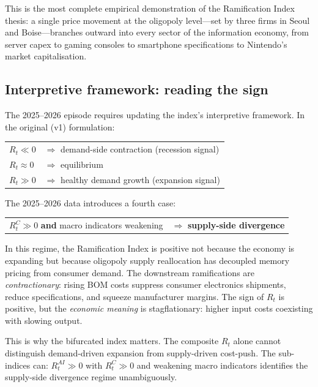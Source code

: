 \documentclass[12pt]{article}
\theoremstyle{definition}
\begin{document}
This is the most complete empirical demonstration of the Ramification Index thesis: a single price movement at the oligopoly level---set by three firms in Seoul and Boise---branches outward into every sector of the information economy, from server capex to gaming consoles to smartphone specifications to Nintendo's market capitalisation.

\subsection{Interpretive framework: reading the sign}

The 2025--2026 episode requires updating the index's interpretive framework. In the original (v1) formulation:

\begin{center}
\begin{tabular}{ll}
$R_t \ll 0$ & $\Rightarrow$ demand-side contraction (recession signal) \\
$R_t \approx 0$ & $\Rightarrow$ equilibrium \\
$R_t \gg 0$ & $\Rightarrow$ healthy demand growth (expansion signal)
\end{tabular}
\end{center}

The 2025--2026 data introduces a fourth case:

\begin{center}
\begin{tabular}{ll}
$R_t^C \gg 0$ \textbf{and} macro indicators weakening & $\Rightarrow$ \textbf{supply-side divergence}
\end{tabular}
\end{center}

In this regime, the Ramification Index is positive not because the economy is expanding but because oligopoly supply reallocation has decoupled memory pricing from consumer demand. The downstream ramifications are \emph{contractionary}: rising BOM costs suppress consumer electronics shipments, reduce specifications, and squeeze manufacturer margins. The sign of $R_t$ is positive, but the \emph{economic meaning} is stagflationary: higher input costs coexisting with slowing output.

This is why the bifurcated index matters. The composite $R_t$ alone cannot distinguish demand-driven expansion from supply-driven cost-push. The sub-indices can: $R_t^{AI} \gg 0$ with $R_t^C \gg 0$ and weakening macro indicators identifies the supply-side divergence regime unambiguously.
\end{document}

